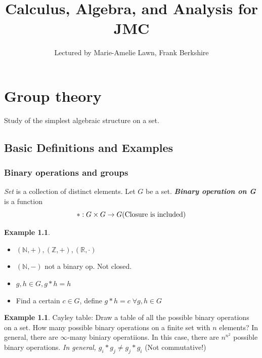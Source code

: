 \documentclass[12pt]{report}
\author{Lectured by Marie-Amelie Lawn, Frank Berkshire}
\title{Calculus, Algebra, and Analysis for JMC}
\affil{Typed by Aris Zhu Yi Qing}
\theoremstyle{definition}
\begin{document}
\maketitle
\tableofcontents

\chapter{Group theory}

Study of the simplest algebraic structure on a set.

\section{Basic Definitions and Examples}

\subsection{Binary operations and groups}

\begin{theorem}
    \emph{Set} is a collection of distinct elements. Let $G$ be a set.
    \textbf{\emph{Binary operation on G}} is a function\[
        *: G \times G \rightarrow G \textnormal{(Closure is included)}
    \]
\end{theorem}

\newtheorem{ex}[theorem]{Example}
\begin{ex}
    \;
    
    \begin{itemize}
        \item $(\mathbb{N}, +), (\mathbb{Z}, +), (\mathbb{R}, \cdot)$
        \item $(\mathbb{N}, -)$ not a binary op. Not closed.
        \item $g, h \in G, g * h = h$
        \item Find a certain $c \in G$, define $g*h = c \;\forall g, h \in G$
    \end{itemize}
    
\end{ex}

\begin{ex}
    Cayley table: Draw a table of all the possible binary operations on a set.
    How many possible binary operations on a finite set with $n$ elements?
    In general, there are $\infty$-many biniary operatiions. In this case, there are $n^{n^2}$ possible binary operations.
    \emph{In general, $g_i * g_j \neq g_j * g_i$} (Not commutative!)
    
\end{ex}
\end{document}
